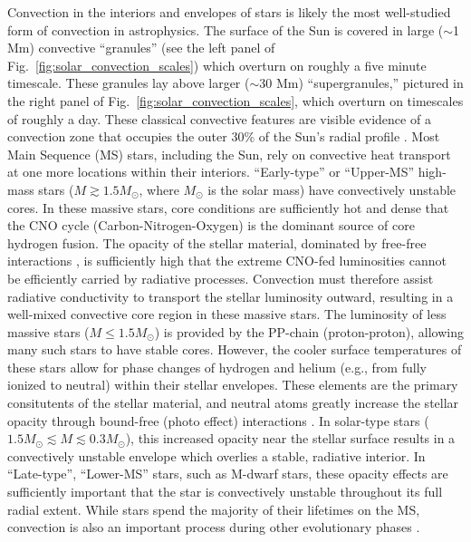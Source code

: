 Convection in the interiors and envelopes of stars is likely the most well-studied form of convection in astrophysics.
The surface of the Sun is covered in large ($\sim$1 Mm) convective ``granules'' (see the left panel of Fig.~\ref{fig:solar_convection_scales}) which overturn on roughly a five minute timescale.
These granules lay above larger ($\sim$30 Mm) ``supergranules,'' pictured in the right panel of Fig.~\ref{fig:solar_convection_scales}, which overturn on timescales of roughly a day.
These classical convective features are visible evidence of a convection zone that occupies the outer 30\% of the Sun's radial profile \citep{miesch2005, nordlund&all2009}.
Most Main Sequence (MS) stars, including the Sun, rely on convective heat transport at one more locations within their interiors.
``Early-type'' or ``Upper-MS'' high-mass stars ($M \gtrsim 1.5 M_\odot$, where $M_\odot$ is the solar mass) have convectively unstable cores.
In these massive stars, core conditions are sufficiently hot and dense that the CNO cycle (Carbon-Nitrogen-Oxygen) is the dominant source of core hydrogen fusion.
The opacity of the stellar material, dominated by free-free interactions \citep[c.f.~Ch.~16 of][]{weiss&all2004}, is sufficiently high that the extreme CNO-fed luminosities cannot be efficiently carried by radiative processes.
Convection must therefore assist radiative conductivity to transport the stellar luminosity outward, resulting in a well-mixed convective core region in these massive stars.
The luminosity of less massive stars ($M \leq 1.5 M_\odot$) is provided by the PP-chain (proton-proton), allowing many such stars to have stable cores.
However, the cooler surface temperatures of these stars allow for phase changes of hydrogen and helium (e.g., from fully ionized to neutral) within their stellar envelopes.
These elements are the primary consitutents of the stellar material, and neutral atoms greatly increase the stellar opacity through bound-free (photo effect) interactions \citep[these effects were first studied in simple convective systems by][]{rast&toomre1993a, rast&toomre1993b}.
In solar-type stars ($1.5 M_\odot \lesssim M \lesssim 0.3 M_\odot$), this increased opacity near the stellar surface results in a convectively unstable envelope which overlies a stable, radiative interior.
In ``Late-type'', ``Lower-MS'' stars, such as M-dwarf stars, these opacity effects are sufficiently important that the star is convectively unstable throughout its full radial extent.
While stars spend the majority of their lifetimes on the MS, convection is also an important process during other evolutionary phases \citep[and I refer the reader to chapter 2 of][for a broad but brief overview of stellar evolutionary phases]{HKT}.

